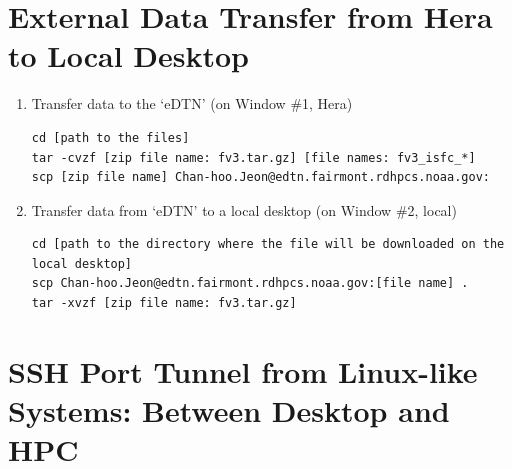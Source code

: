 \documentclass[11pt,fleqn]{report}              %
\begin{document}
\section{External Data Transfer from Hera to Local Desktop}

\begin{enumerate}
\item Transfer data to the `eDTN' (on Window \#1, Hera)
\lstset{language=bash}   
\begin{lstlisting}[frame=trBL]
cd [path to the files]
tar -cvzf [zip file name: fv3.tar.gz] [file names: fv3_isfc_*]
scp [zip file name] Chan-hoo.Jeon@edtn.fairmont.rdhpcs.noaa.gov:
\end{lstlisting}

\item Transfer data from `eDTN' to a local desktop (on Window \#2, local)
\lstset{language=bash}   
\begin{lstlisting}[frame=trBL]
cd [path to the directory where the file will be downloaded on the local desktop]
scp Chan-hoo.Jeon@edtn.fairmont.rdhpcs.noaa.gov:[file name] .
tar -xvzf [zip file name: fv3.tar.gz]
\end{lstlisting}

\end{enumerate}


\section{SSH Port Tunnel from Linux-like Systems: Between Desktop and HPC}
\end{document}
